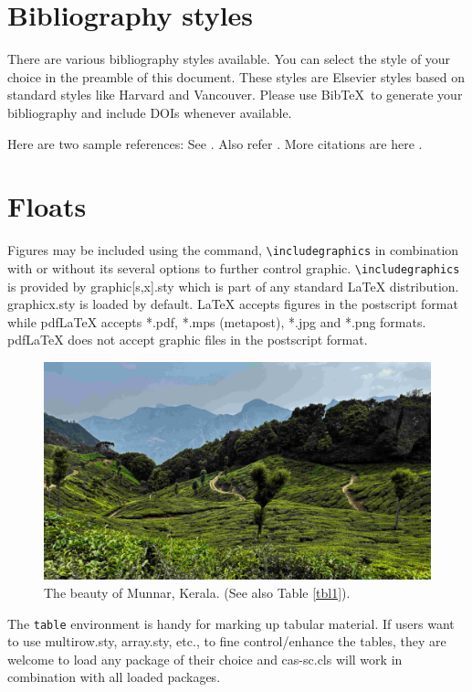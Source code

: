 \documentclass[a4paper,fleqn]{cas-sc}
\begin{document}
\section{Bibliography styles}

There are various bibliography styles available. You can select the
style of your choice in the preamble of this document. These styles are
Elsevier styles based on standard styles like Harvard and Vancouver.
Please use Bib\TeX\ to generate your bibliography and include DOIs
whenever available.

Here are two sample references: 
See \citet{Fortunato2010}. Also refer \citet{Fortunato2010,NewmanGirvan2004}.
More citations are here \citep{Fortunato2010,Vehlowetal2013}.

\section{Floats}
{Figures} may be included using the command, \verb+\includegraphics+ in
combination with or without its several options to further control
graphic. \verb+\includegraphics+ is provided by {graphic[s,x].sty}
which is part of any standard \LaTeX{} distribution.
{graphicx.sty} is loaded by default. \LaTeX{} accepts figures in
the postscript format while pdf\LaTeX{} accepts {*.pdf},
{*.mps} (metapost), {*.jpg} and {*.png} formats. 
pdf\LaTeX{} does not accept graphic files in the postscript format. 

\begin{figure}
	\centering
	\includegraphics[width=.9\textwidth]{figs/cas-munnar-2024.jpg}
	\caption{The beauty of Munnar, Kerala. (See also Table \protect\ref{tbl1}).}
	\label{FIG:1}
\end{figure}


The \verb+table+ environment is handy for marking up tabular
material. If users want to use {multirow.sty},
{array.sty}, etc., to fine control/enhance the tables, they
are welcome to load any package of their choice and
{cas-sc.cls} will work in combination with all loaded
packages.
\end{document}
